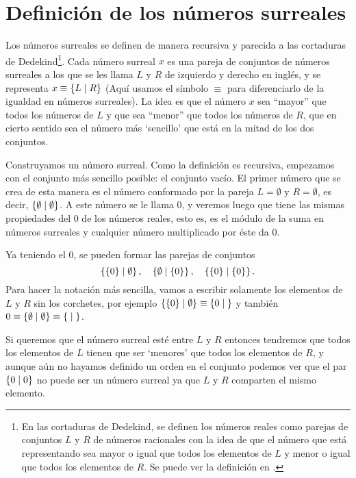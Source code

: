     
    
\section{Definici\'on de los n\'umeros surreales}

    Los números surreales se definen de manera recursiva y parecida a las cortaduras de Dedekind\footnote{En las cortaduras de Dedekind, se definen los n\'umeros reales como parejas de conjuntos $L$ y $R$ de n\'umeros racionales con la idea de que el n\'umero que est\'a representando sea mayor o igual que todos los elementos de $L$ y menor o igual que todos los elementos de $R$. Se puede ver la definici\'on en \cite{Dedekind1963-rt}.}. Cada n\'umero surreal $x$ es una pareja de conjuntos de n\'umeros surreales a los que se les llama $L$ y $R$ de izquierdo y derecho en ingl\'es, y se representa $x \equiv \left\{L\;\middle|\; R\right\}$ (Aqu\'i usamos el s\'imbolo $\equiv$ para diferenciarlo de la igualdad en n\'umeros surreales). La idea es que el n\'umero $x$ sea ``mayor'' que todos los n\'umeros de $L$ y que sea ``menor'' que todos los n\'umeros de $R$, que en cierto sentido sea el n\'umero m\'as `sencillo' que est\'a en la mitad de los dos conjuntos.

    Construyamos un n\'umero surreal. Como la definici\'on es recursiva, empezamos con el conjunto m\'as sencillo posible: el conjunto vac\'io. El primer n\'umero que se crea de esta manera es el n\'umero conformado por la pareja $L = \emptyset$ y $R=\emptyset$, es decir, $\left\{\emptyset\;\middle|\; \emptyset\right\}$. A este n\'umero se le llama $0$, y veremos luego que tiene las mismas propiedades del $0$ de los n\'umeros reales, esto es, es el m\'odulo de la suma en n\'umeros surreales y cualquier n\'umero multiplicado por \'este da $0$.

    Ya teniendo el $0$, se pueden formar las parejas de conjuntos
    \[
        \left\{\{0\}\;\middle|\; \emptyset\right\}, \quad \left\{\emptyset\;\middle|\; \{0\}\right\}, \quad \left\{\{0\}\;\middle|\; \{0\}\right\}.
    \]
    Para hacer la notaci\'on m\'as sencilla, vamos a escribir solamente los elementos de $L$ y $R$ sin los corchetes, por ejemplo $\left\{\{0\}\;\middle|\; \emptyset\right\} \equiv \left\{0\;\middle|\; \right\}$ y tambi\'en $0 \equiv \left\{\emptyset\;\middle|\; \emptyset\right\} \equiv \left\{\;\middle|\; \right\}$.

    Si queremos que el n\'umero surreal est\'e entre $L$ y $R$ entonces tendremos que todos los elementos de $L$ tienen que ser `menores' que todos los elementos de $R$, y aunque a\'un no hayamos definido un orden en el conjunto podemos ver que el par $\left\{0\;\middle|\; 0\right\}$ no puede ser un n\'umero surreal ya que $L$ y $R$ comparten el mismo elemento.

